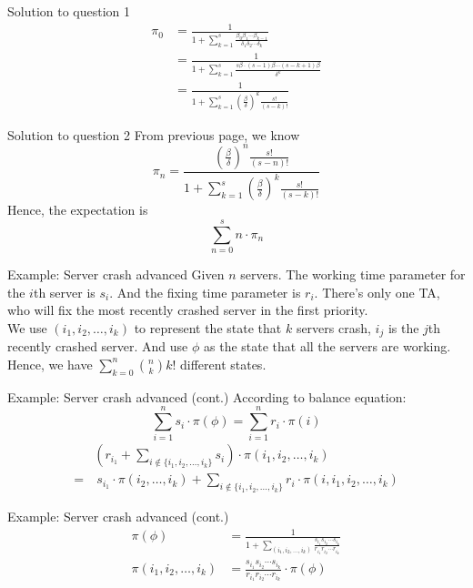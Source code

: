 \documentclass[mathserif]{beamer}
\begin{document}
\begin{frame}{Solution to question 1}
\begin{align*}
\pi_0 & = \frac{1}{1 + \sum_{k=1}^s \frac{\beta_0 \beta_1 \cdots \beta_{k-1}}{\delta_1 \delta_2 \cdots \delta_k}} \\
& = \frac{1}{1 + \sum_{k=1}^s \frac{s\beta\cdot (s-1)\beta \cdots (s-k+1)\beta}{\delta^k}} \\
& = \frac{1}{1 + \sum_{k=1}^s \left( \frac{\beta}{\delta} \right)^k \frac{s!}{(s-k)!}}
\end{align*}
\end{frame}

\begin{frame}{Solution to question 2}
From previous page, we know
\[
\pi_n = \frac{\left( \frac{\beta}{\delta} \right)^n \frac{s!}{(s-n)!}}
{1 + \sum_{k=1}^s \left( \frac{\beta}{\delta} \right)^k \frac{s!}{(s-k)!}}
\]
Hence, the expectation is
\[
\sum_{n=0}^s n\cdot \pi_n
\]
\end{frame}

\begin{frame}{Example: Server crash advanced}
Given $n$ servers.
The working time parameter for the $i$th server is $s_i$.
And the fixing time parameter is $r_i$.
There's only one TA, who will fix the most recently crashed server in the first priority.\\
\vspace{\baselineskip}
We use $(i_1, i_2, \ldots, i_k)$ to represent the state that $k$ servers crash, $i_j$ is the $j$th recently crashed server.
And use $\phi$ as the state that all the servers are working.
Hence, we have $\sum_{k=0}^n \binom{n}{k} k!$ different states.
\end{frame}

\begin{frame}{Example: Server crash advanced (cont.)}
According to balance equation:
\[
\sum_{i=1}^n s_i\cdot \pi(\phi) = \sum_{i=1}^n r_i\cdot \pi(i)
\]
\begin{align*}
& \left( r_{i_1} + \sum_{i\notin\{i_1, i_2, \ldots, i_k\}}s_i \right)\cdot \pi(i_1, i_2, \ldots, i_k) \\
= &~ s_{i_1}\cdot \pi(i_2, \ldots, i_k) + \sum_{i\notin\{i_1, i_2, \ldots, i_k\}} r_i\cdot \pi(i, i_1, i_2, \ldots, i_k)
\end{align*}
\end{frame}

\begin{frame}{Example: Server crash advanced (cont.)}
\begin{align*}
\pi(\phi) & = \frac{1}{1 + \sum_{(i_1, i_2, \ldots, i_k)} \frac{s_{i_1} s_{i_2}\cdots s_{i_k}}{r_{i_1} r_{i_2}\cdots r_{i_k}}} \\
\pi(i_1, i_2, \ldots, i_k) & = \frac{s_{i_1} s_{i_2}\cdots s_{i_k}}{r_{i_1} r_{i_2}\cdots r_{i_k}}\cdot \pi(\phi)
\end{align*}
\end{frame}
\end{document}
